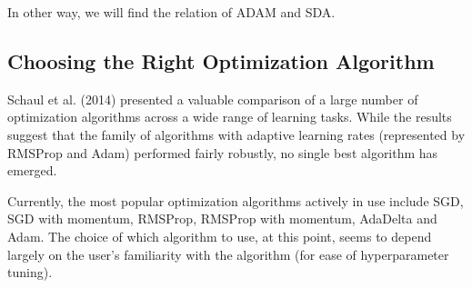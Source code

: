 In other way, we will find the relation of ADAM and SDA.


\subsection{Choosing the Right Optimization Algorithm}
Schaul et al. (2014) presented a valuable comparison of a large number of optimization algorithms across a wide range of learning tasks. While the results suggest that the family of algorithms with adaptive learning rates (represented by RMSProp and Adam) performed fairly robustly, no single best algorithm has emerged.

Currently, the most popular optimization algorithms actively in use include SGD, SGD with momentum, RMSProp, RMSProp with momentum, AdaDelta and Adam. The choice of which algorithm to use, at this point, seems to depend largely on the user's familiarity with the algorithm (for ease of hyperparameter tuning).

